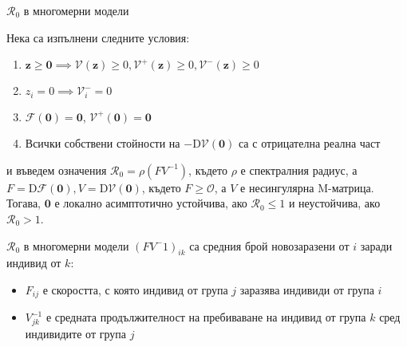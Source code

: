 \begin{frame}[t]{$\mathscr{R}_0$ в многомерни модели}
  \begin{theorem}
    Нека са изпълнени следните условия:
    \begin{enumerate}
      \item $\boldsymbol{z} \geq \boldsymbol{0} \implies \mathscr{V}(\boldsymbol{z}) \geq 0, \mathscr{V}^+(\boldsymbol{z}) \geq 0, \mathscr{V}^-(\boldsymbol{z}) \geq 0$
      \item $z_i = 0 \implies \mathscr{V}_{i}^- = 0$
      \item $\mathscr{F}(\boldsymbol{0}) = \boldsymbol{0}$, $\mathscr{V}^+(\boldsymbol{0}) = \boldsymbol{0}$
      \item Всички собствени стойности на $-\mathrm{D}\mathscr{V}{(\boldsymbol{0})}$ са с отрицателна реална част
    \end{enumerate}
    и въведем означения $\mathscr{R}_0 = \rho(F V^{-1})$, където $\rho$ е спектралния радиус, а $F = \mathrm{D}\mathscr{F}(\boldsymbol{0}), V = \mathrm{D} \mathscr{V}(\boldsymbol{0})$, където $F \geq \mathscr{O}$, а $V$ е несингулярна M-матрица. \\
    Тогава, $\boldsymbol{0}$ е локално асимптотично устойчива, ако $\mathscr{R}_0 \leq 1$ и неустойчива, ако $\mathscr{R}_0 > 1$.
  \end{theorem}
\end{frame}

\begin{frame}[t]{$\mathscr{R}_0$ в многомерни модели}
  $(F V^-1)_{ik}$ са средния брой новозаразени от $i$ заради индивид от $k$:
  \begin{itemize}
    \item $F_{ij}$ е скоростта, с която индивид от група $j$ заразява индивиди от група $i$
    \item $V^{-1}_{jk}$ е средната продължителност на пребиваване на индивид от група $k$ сред индивидите от група $j$
  \end{itemize}
\end{frame}
